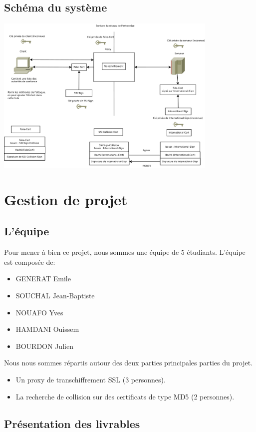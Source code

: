 \documentclass[a4paper,11pt,french]{report}
\begin{document}
\subsection{Schéma du système}
\includegraphics[width=0.8\textwidth]{../../STB/images/schema_autorites.pdf}


\section{Gestion de projet}

\subsection{L'équipe}
Pour mener à bien ce projet, nous sommes une équipe de 5 étudiants. 
L'équipe est composée de:
\begin{itemize}
\item GENERAT Emile 
\item SOUCHAL Jean-Baptiste
\item NOUAFO Yves
\item HAMDANI Ouissem
\item BOURDON Julien
\end{itemize}
Nous nous sommes répartis autour des deux parties principales parties du projet.
\begin{itemize}
  \item Un proxy de transchiffrement SSL (3 personnes).
  \item La recherche de collision sur des certificats de type MD5 (2 personnes).

\end{itemize}


\subsection{Présentation des livrables}
\end{document}
